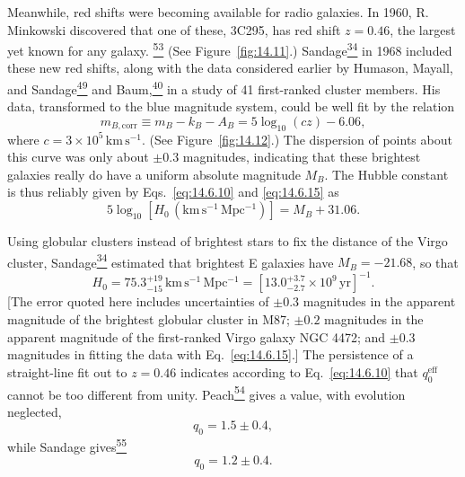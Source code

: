 Meanwhile, red shifts were becoming available for radio galaxies. In 1960,
R. Minkowski discovered that one of these, 3C295, has red shift \(z=0.46\),
the largest yet known for any galaxy.%
\hyperref[ch14-ref-53]{\textsuperscript{53}}
(See Figure~\ref{fig:14.11}.)
Sandage\hyperref[ch14-ref-34]{\textsuperscript{34}} in 1968 included these
new red shifts, along with the data considered earlier by Humason, Mayall,
and Sandage\hyperref[ch14-ref-49]{\textsuperscript{49}} and
Baum,\hyperref[ch14-ref-40]{\textsuperscript{40}} in a study of 41
first-ranked cluster members. His data, transformed to the blue magnitude
system, could be well fit by the relation
\begin{equation}
  m_{B,\mathrm{corr}}
  \equiv
  m_B-k_B-A_B
  =
  5\log_{10}(cz)-6.06,
  \tag{14.6.15}\label{eq:14.6.15}
\end{equation}
where \(c=3\times10^5\,\mathrm{km\,s^{-1}}\). (See
Figure~\ref{fig:14.12}.) The dispersion of points about this curve was only
about \(\pm0.3\) magnitudes, indicating that these brightest galaxies really
do have a uniform absolute magnitude \(M_B\). The Hubble constant is thus
reliably given by Eqs.~\eqref{eq:14.6.10} and \eqref{eq:14.6.15} as
\begin{equation}
  5\log_{10}
  \left[
    H_0\,(\mathrm{km\,s^{-1}\,Mpc^{-1}})
  \right]
  =
  M_B+31.06.
  \tag{14.6.16}\label{eq:14.6.16}
\end{equation}



Using globular clusters instead of brightest stars to fix the distance of
the Virgo cluster, Sandage\hyperref[ch14-ref-34]{\textsuperscript{34}}
estimated that brightest E galaxies have \(M_B=-21.68\), so that
\begin{equation}
  H_0
  =
  75.3_{-15}^{+19}\,\mathrm{km\,s^{-1}\,Mpc^{-1}}
  =
  \left[
    13.0_{-2.7}^{+3.7}\times10^9\,\mathrm{yr}
  \right]^{-1}.
  \tag{14.6.17}\label{eq:14.6.17}
\end{equation}
[The error quoted here includes uncertainties of \(\pm0.3\) magnitudes in
the apparent magnitude of the brightest globular cluster in M87;
\(\pm0.2\) magnitudes in the apparent magnitude of the first-ranked Virgo
galaxy NGC 4472; and \(\pm0.3\) magnitudes in fitting the data with
Eq.~\eqref{eq:14.6.15}.] The persistence of a straight-line fit out to
\(z=0.46\) indicates according to Eq.~\eqref{eq:14.6.10} that
\(q_0^{\mathrm{eff}}\) cannot be too different from unity.
Peach\hyperref[ch14-ref-54]{\textsuperscript{54}} gives a value, with
evolution neglected,
\begin{equation}
  q_0=1.5\pm0.4,
  \tag{14.6.18}\label{eq:14.6.18}
\end{equation}
while Sandage gives\hyperref[ch14-ref-55]{\textsuperscript{55}}
\begin{equation}
  q_0=1.2\pm0.4.
  \tag{14.6.19}\label{eq:14.6.19}
\end{equation}

